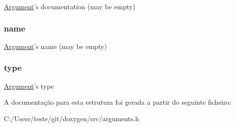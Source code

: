 \hyperlink{struct_argument}{Argument}'s documentation (may be empty) \hypertarget{struct_argument_adc0097c7bd1e61ad32058fcde425bc7a}{
\subsubsection[{name}]{ name}}\label{struct_argument_adc0097c7bd1e61ad32058fcde425bc7a}
\hyperlink{struct_argument}{Argument}'s name (may be empty) \hypertarget{struct_argument_a0d4463771e24026060ae68b04822d7af}{
\subsubsection[{type}]{ type}}\label{struct_argument_a0d4463771e24026060ae68b04822d7af}
\hyperlink{struct_argument}{Argument}'s type 

A documentação para esta estrutura foi gerada a partir do seguinte ficheiro\-:\begin{DoxyCompactItemize}
\item 
C\-:/\-Users/teste/git/doxygen/src/arguments.\-h\end{DoxyCompactItemize}
